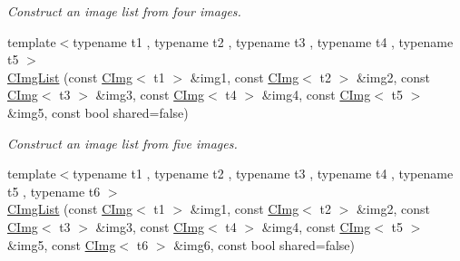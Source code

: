 \begin{DoxyCompactItemize}
\begin{DoxyCompactList}\small\item\em Construct an image list from four images. \item\end{DoxyCompactList}\item 
\hypertarget{structcimg__library_1_1CImgList_ae8a47967d6d90aada6e573e8ba5e85f7}{
{\footnotesize template$<$typename t1 , typename t2 , typename t3 , typename t4 , typename t5 $>$ }\\\hyperlink{structcimg__library_1_1CImgList_ae8a47967d6d90aada6e573e8ba5e85f7}{CImgList} (const \hyperlink{structcimg__library_1_1CImg}{CImg}$<$ t1 $>$ \&img1, const \hyperlink{structcimg__library_1_1CImg}{CImg}$<$ t2 $>$ \&img2, const \hyperlink{structcimg__library_1_1CImg}{CImg}$<$ t3 $>$ \&img3, const \hyperlink{structcimg__library_1_1CImg}{CImg}$<$ t4 $>$ \&img4, const \hyperlink{structcimg__library_1_1CImg}{CImg}$<$ t5 $>$ \&img5, const bool shared=false)}
\label{structcimg__library_1_1CImgList_ae8a47967d6d90aada6e573e8ba5e85f7}

\begin{DoxyCompactList}\small\item\em Construct an image list from five images. \item\end{DoxyCompactList}\item 
\hypertarget{structcimg__library_1_1CImgList_a301d324197166fb2ac137a1f243ec641}{
{\footnotesize template$<$typename t1 , typename t2 , typename t3 , typename t4 , typename t5 , typename t6 $>$ }\\\hyperlink{structcimg__library_1_1CImgList_a301d324197166fb2ac137a1f243ec641}{CImgList} (const \hyperlink{structcimg__library_1_1CImg}{CImg}$<$ t1 $>$ \&img1, const \hyperlink{structcimg__library_1_1CImg}{CImg}$<$ t2 $>$ \&img2, const \hyperlink{structcimg__library_1_1CImg}{CImg}$<$ t3 $>$ \&img3, const \hyperlink{structcimg__library_1_1CImg}{CImg}$<$ t4 $>$ \&img4, const \hyperlink{structcimg__library_1_1CImg}{CImg}$<$ t5 $>$ \&img5, const \hyperlink{structcimg__library_1_1CImg}{CImg}$<$ t6 $>$ \&img6, const bool shared=false)}
\label{structcimg__library_1_1CImgList_a301d324197166fb2ac137a1f243ec641}


\end{DoxyCompactItemize}
